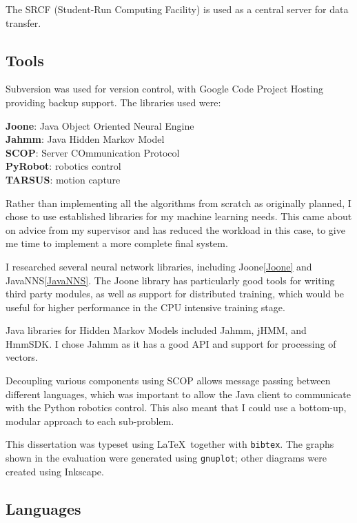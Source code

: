 \documentclass[12pt,a4,notitlepage]{report}
\renewcommand{\_}{\texttt{\symbol{95}}}
\newcommand{\<}{\texttt{\symbol{60}}}
\renewcommand{\>}{\texttt{\symbol{62}}}
\begin{document}
The SRCF (Student-Run Computing Facility\cite{SRCF}) is used as a central server for data transfer.

\subsection{Tools}

Subversion was used for version control, with Google Code Project Hosting providing backup support. The libraries used were:

\textbf{Joone}: Java Object Oriented Neural Engine \cite{Joone}\\
\textbf{Jahmm}: Java Hidden Markov Model \cite{Jahmm} \\
\textbf{SCOP}: Server COmmunication Protocol \cite{SCOP} \\
\textbf{PyRobot}: robotics control \cite{PyRobot}\\
\textbf{TARSUS}: motion capture

Rather than implementing all the algorithms from scratch as originally planned, I chose to use established libraries for my machine learning needs. This came about on advice from my supervisor and has reduced the workload in this case, to give me time to implement a more complete final system.

I researched several neural network libraries, including Joone\ref{Joone} and JavaNNS\ref{JavaNNS}. The Joone library has particularly good tools for writing third party modules, as well as support for distributed training, which would be useful for higher performance in the CPU intensive training stage.

Java libraries for Hidden Markov Models included Jahmm\cite{Jahmm}, jHMM, and HmmSDK. I chose Jahmm as it has a good API and support for processing of vectors.

Decoupling various components using SCOP allows message passing between different languages, which was 
important to allow the Java client to communicate with the Python robotics control. This also meant that I could use a bottom-up, modular approach to each sub-problem.

This dissertation was typeset using \LaTeX\, together with \texttt{bibtex}. The graphs shown in the evaluation were generated using \texttt{gnuplot}; other diagrams were created using Inkscape.

\subsection{Languages}
\end{document}
